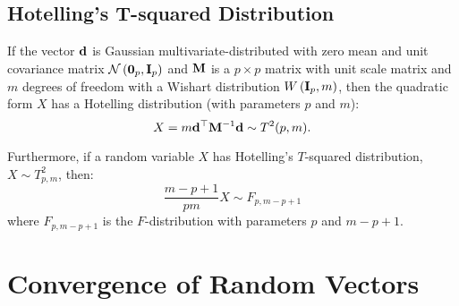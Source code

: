 \subsection{Hotelling's T-squared Distribution}

\begin{definition}
	If the vector ${\bf d}$ is Gaussian multivariate-distributed with zero mean and unit covariance matrix ${\mathcal N}\left(\mathbf{0}_p,{\bf I}_{p}\right)$ and ${\bf M}$ is a $p\times p$ matrix with unit scale matrix and $m$ degrees of freedom with a Wishart distribution $W\left({\bf I}_{p},m\right)$, then the quadratic form $X$ has a Hotelling distribution (with parameters $p$ and $m$):
	\begin{equation*}
		X=m{\bf d}^{\top}{\bf M}^{-1}{\bf d}\sim T^2(p,m) .
	\end{equation*}

	Furthermore, if a random variable $X$ has Hotelling's $T$-squared distribution, $X \sim T_{p,m}^2$, then:
	\begin{equation*}
		\frac{m-p+1}{pm}X\sim F_{p,m-p+1}
	\end{equation*}
	where $F_{p,m-p+1}$ is the $F$-distribution with parameters $p$ and $m-p+1$.
\end{definition}

\section{Convergence of Random Vectors}

\begin{example}[Multinomial]
    
\end{example}